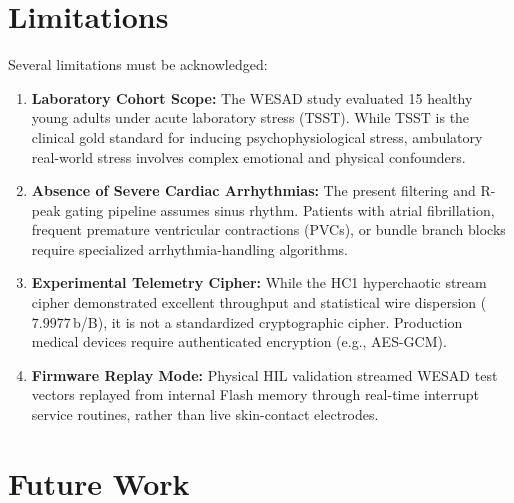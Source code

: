 \documentclass[conference]{IEEEtran}
\begin{document}
\section{Limitations}
\label{sec:limitations}

Several limitations must be acknowledged:
\begin{enumerate}
    \item \textbf{Laboratory Cohort Scope:} The WESAD study evaluated 15 healthy young adults under acute laboratory stress (TSST). While TSST is the clinical gold standard for inducing psychophysiological stress, ambulatory real-world stress involves complex emotional and physical confounders.
    \item \textbf{Absence of Severe Cardiac Arrhythmias:} The present filtering and R-peak gating pipeline assumes sinus rhythm. Patients with atrial fibrillation, frequent premature ventricular contractions (PVCs), or bundle branch blocks require specialized arrhythmia-handling algorithms.
    \item \textbf{Experimental Telemetry Cipher:} While the HC1 hyperchaotic stream cipher demonstrated excellent throughput and statistical wire dispersion ($7.9977$\,b/B), it is not a standardized cryptographic cipher. Production medical devices require authenticated encryption (e.g., AES-GCM).
    \item \textbf{Firmware Replay Mode:} Physical HIL validation streamed WESAD test vectors replayed from internal Flash memory through real-time interrupt service routines, rather than live skin-contact electrodes.
\end{enumerate}

\section{Future Work}
\label{sec:future_work}
\end{document}
